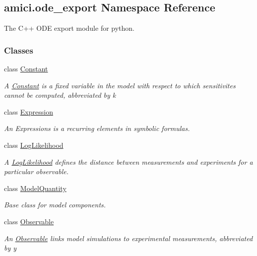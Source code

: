 \hypertarget{namespaceamici_1_1ode__export}{}\subsection{amici.\+ode\+\_\+export Namespace Reference}
\label{namespaceamici_1_1ode__export}


The C++ O\+DE export module for python.  


\subsubsection*{Classes}
\begin{DoxyCompactItemize}
\item 
class \mbox{\hyperlink{classamici_1_1ode__export_1_1_constant}{Constant}}
\begin{DoxyCompactList}\small\item\em A \mbox{\hyperlink{classamici_1_1ode__export_1_1_constant}{Constant}} is a fixed variable in the model with respect to which sensitivites cannot be computed, abbreviated by {\ttfamily k} \end{DoxyCompactList}\item 
class \mbox{\hyperlink{classamici_1_1ode__export_1_1_expression}{Expression}}
\begin{DoxyCompactList}\small\item\em An Expressions is a recurring elements in symbolic formulas. \end{DoxyCompactList}\item 
class \mbox{\hyperlink{classamici_1_1ode__export_1_1_log_likelihood}{Log\+Likelihood}}
\begin{DoxyCompactList}\small\item\em A \mbox{\hyperlink{classamici_1_1ode__export_1_1_log_likelihood}{Log\+Likelihood}} defines the distance between measurements and experiments for a particular observable. \end{DoxyCompactList}\item 
class \mbox{\hyperlink{classamici_1_1ode__export_1_1_model_quantity}{Model\+Quantity}}
\begin{DoxyCompactList}\small\item\em Base class for model components. \end{DoxyCompactList}\item 
class \mbox{\hyperlink{classamici_1_1ode__export_1_1_observable}{Observable}}
\begin{DoxyCompactList}\small\item\em An \mbox{\hyperlink{classamici_1_1ode__export_1_1_observable}{Observable}} links model simulations to experimental measurements, abbreviated by {\ttfamily y} \end{DoxyCompactList}\item 

\end{DoxyCompactItemize}
